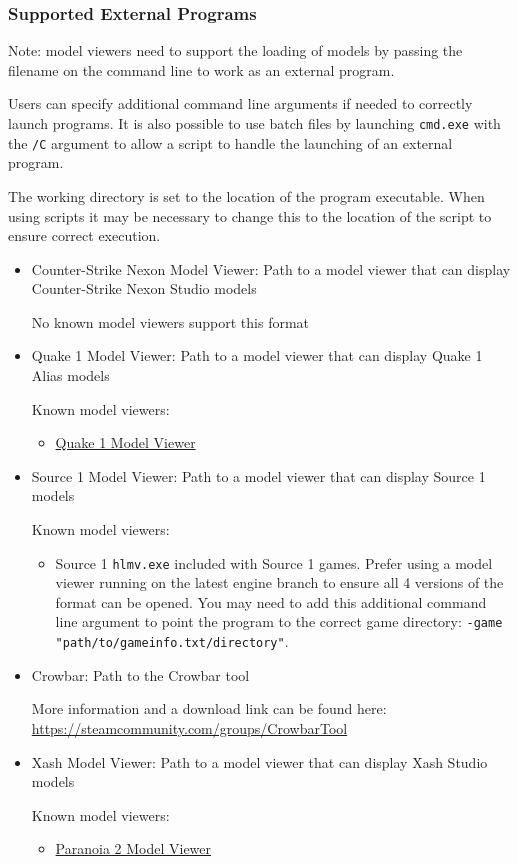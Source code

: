 \documentclass[10pt, a4paper, titlepage, oneside]{article}
\newcommand{\code}[1]{\mbox{\texttt{#1}}}
\begin{document}
\subsubsection{Supported External Programs}
\label{sec:external_programs}

Note: model viewers need to support the loading of models by passing the filename on the command line to work as an external program.

Users can specify additional command line arguments if needed to correctly launch programs. It is also possible to use batch files by launching \code{cmd.exe} with the \code{/C} argument to allow a script to handle the launching of an external program.

The working directory is set to the location of the program executable. When using scripts it may be necessary to change this to the location of the script to ensure correct execution.

\begin{itemize}
\item Counter-Strike Nexon Model Viewer: Path to a model viewer that can display Counter-Strike Nexon Studio models

	No known model viewers support this format
\item Quake 1 Model Viewer: Path to a model viewer that can display Quake 1 Alias models

	Known model viewers:
	\begin{itemize}
	\item \href{https://www.moddb.com/games/quake/downloads/quake-1-model-viewer-v050-alpha}{Quake 1 Model Viewer}
	\end{itemize}
\item Source 1 Model Viewer: Path to a model viewer that can display Source 1 models

	Known model viewers:
	\begin{itemize}
	\item Source 1 \code{hlmv.exe} included with Source 1 games. Prefer using a model viewer running on the latest engine branch to ensure all 4 versions of the format can be opened. You may need to add this additional command line argument to point the program to the correct game directory: \code{-game "path/to/gameinfo.txt/directory"}.
	\end{itemize}
\item Crowbar: Path to the Crowbar tool

	More information and a download link can be found here: \url{https://steamcommunity.com/groups/CrowbarTool}
\item Xash Model Viewer: Path to a model viewer that can display Xash Studio models

	Known model viewers:
	\begin{itemize}
	\item \href{https://gamebanana.com/tools/6828}{Paranoia 2 Model Viewer}
	\end{itemize}
\end{itemize}
\end{document}
